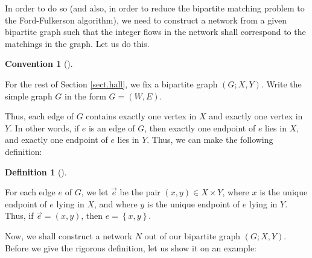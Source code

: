 \documentclass[numbers=enddot,12pt,final,onecolumn,notitlepage]{scrartcl}%
\theoremstyle{definition}
\newtheorem{defi}[theo]{Definition}
\newenvironment{definition}[1][]
{\begin{defi}[#1]\begin{leftbar}}
{\end{leftbar}\end{defi}}
\newtheorem{conv}[theo]{Convention}
\newenvironment{condition}[1][]
{\begin{conv}[#1]\begin{leftbar}}
{\end{leftbar}\end{conv}}
\begin{document}
In order to do so (and also, in order to reduce the bipartite matching problem
to the Ford-Fulkerson algorithm), we need to construct a network from a given
bipartite graph such that the integer flows in the network shall correspond to
the matchings in the graph. Let us do this.

\begin{condition}
For the rest of Section \ref{sect.hall}, we fix a bipartite graph $\left(
G;X,Y\right)  $. Write the simple graph $G$ in the form $G=\left(  W,E\right)
$.
\end{condition}

Thus, each edge of $G$ contains exactly one vertex in $X$ and exactly one
vertex in $Y$. In other words, if $e$ is an edge of $G$, then exactly one
endpoint of $e$ lies in $X$, and exactly one endpoint of $e$ lies in $Y$.
Thus, we can make the following definition:

\begin{definition}
For each edge $e$ of $G$, we let $\overrightarrow{e}$ be the pair $\left(
x,y\right)  \in X\times Y$, where $x$ is the unique endpoint of $e$ lying in
$X$, and where $y$ is the unique endpoint of $e$ lying in $Y$. Thus, if
$\overrightarrow{e}=\left(  x,y\right)  $, then $e=\left\{  x,y\right\}  $.
\end{definition}

Now, we shall construct a network $N$ out of our bipartite graph $\left(
G;X,Y\right)  $. Before we give the rigorous definition, let us show it on an
example:\newpage
\end{document}
